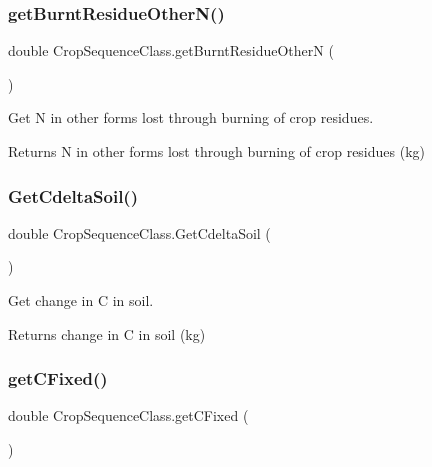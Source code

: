 \subsubsection{\texorpdfstring{getBurntResidueOtherN()}{getBurntResidueOtherN()}}
{\footnotesize\ttfamily double Crop\+Sequence\+Class.\+get\+Burnt\+Residue\+OtherN (\begin{DoxyParamCaption}{ }\end{DoxyParamCaption})\hspace{0.3cm}{\ttfamily [inline]}}



Get N in other forms lost through burning of crop residues. 

\begin{DoxyReturn}{Returns}
N in other forms lost through burning of crop residues (kg) 
\end{DoxyReturn}
\mbox{\label{class_crop_sequence_class_aad00e0d95ab118f4bacec6a9fba51230}} 
\subsubsection{\texorpdfstring{GetCdeltaSoil()}{GetCdeltaSoil()}}
{\footnotesize\ttfamily double Crop\+Sequence\+Class.\+Get\+Cdelta\+Soil (\begin{DoxyParamCaption}{ }\end{DoxyParamCaption})\hspace{0.3cm}{\ttfamily [inline]}}



Get change in C in soil. 

\begin{DoxyReturn}{Returns}
change in C in soil (kg) 
\end{DoxyReturn}
\mbox{\label{class_crop_sequence_class_a166831b02adbb3428ef7989c4dde6d4b}} 
\subsubsection{\texorpdfstring{getCFixed()}{getCFixed()}}
{\footnotesize\ttfamily double Crop\+Sequence\+Class.\+get\+C\+Fixed (\begin{DoxyParamCaption}{ }\end{DoxyParamCaption})\hspace{0.3cm}{\ttfamily [inline]}}



